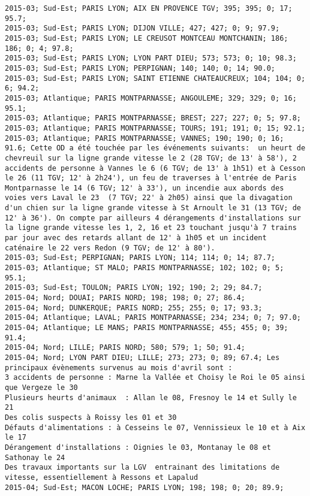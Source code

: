 \documentclass{article}
\begin{document}
\begin{Verbatim}[commandchars=\\\{\}]
2015-03; Sud-Est; PARIS LYON; AIX EN PROVENCE TGV; 395; 395; 0; 17; 95.7; 
2015-03; Sud-Est; PARIS LYON; DIJON VILLE; 427; 427; 0; 9; 97.9; 
2015-03; Sud-Est; PARIS LYON; LE CREUSOT MONTCEAU MONTCHANIN; 186; 186; 0; 4; 97.8; 
2015-03; Sud-Est; PARIS LYON; LYON PART DIEU; 573; 573; 0; 10; 98.3; 
2015-03; Sud-Est; PARIS LYON; PERPIGNAN; 140; 140; 0; 14; 90.0; 
2015-03; Sud-Est; PARIS LYON; SAINT ETIENNE CHATEAUCREUX; 104; 104; 0; 6; 94.2; 
2015-03; Atlantique; PARIS MONTPARNASSE; ANGOULEME; 329; 329; 0; 16; 95.1; 
2015-03; Atlantique; PARIS MONTPARNASSE; BREST; 227; 227; 0; 5; 97.8; 
2015-03; Atlantique; PARIS MONTPARNASSE; TOURS; 191; 191; 0; 15; 92.1; 
2015-03; Atlantique; PARIS MONTPARNASSE; VANNES; 190; 190; 0; 16; 91.6; Cette OD a été touchée par les événements suivants:  un heurt de chevreuil sur la ligne grande vitesse le 2 (28 TGV; de 13' à 58'), 2 accidents de personne à Vannes le 6 (6 TGV; de 13' à 1h51) et à Cesson le 26 (11 TGV; 12' à 2h24'), un feu de traverses à l'entrée de Paris Montparnasse le 14 (6 TGV; 12' à 33'), un incendie aux abords des voies vers Laval le 23  (7 TGV; 22' à 2h05) ainsi que la divagation d'un chien sur la ligne grande vitesse à St Arnoult le 31 (13 TGV; de 12' à 36'). On compte par ailleurs 4 dérangements d'installations sur la ligne grande vitesse les 1, 2, 16 et 23 touchant jusqu'à 7 trains par jour avec des retards allant de 12' à 1h05 et un incident caténaire le 22 vers Redon (9 TGV; de 12' à 80').
2015-03; Sud-Est; PERPIGNAN; PARIS LYON; 114; 114; 0; 14; 87.7; 
2015-03; Atlantique; ST MALO; PARIS MONTPARNASSE; 102; 102; 0; 5; 95.1; 
2015-03; Sud-Est; TOULON; PARIS LYON; 192; 190; 2; 29; 84.7; 
2015-04; Nord; DOUAI; PARIS NORD; 198; 198; 0; 27; 86.4; 
2015-04; Nord; DUNKERQUE; PARIS NORD; 255; 255; 0; 17; 93.3; 
2015-04; Atlantique; LAVAL; PARIS MONTPARNASSE; 234; 234; 0; 7; 97.0; 
2015-04; Atlantique; LE MANS; PARIS MONTPARNASSE; 455; 455; 0; 39; 91.4; 
2015-04; Nord; LILLE; PARIS NORD; 580; 579; 1; 50; 91.4; 
2015-04; Nord; LYON PART DIEU; LILLE; 273; 273; 0; 89; 67.4; Les principaux évènements survenus au mois d'avril sont :
3 accidents de personne : Marne la Vallée et Choisy le Roi le 05 ainsi que Vergeze le 30
Plusieurs heurts d'animaux  : Allan le 08, Fresnoy le 14 et Sully le 21
Des colis suspects à Roissy les 01 et 30
Défauts d'alimentations : à Cesseins le 07, Vennissieux le 10 et à Aix le 17
Dérangement d'installations : Oignies le 03, Montanay le 08 et Sathonay le 24
Des travaux importants sur la LGV  entrainant des limitations de vitesse, essentiellement à Ressons et Lapalud
2015-04; Sud-Est; MACON LOCHE; PARIS LYON; 198; 198; 0; 20; 89.9; 

\end{Verbatim}
\end{document}
